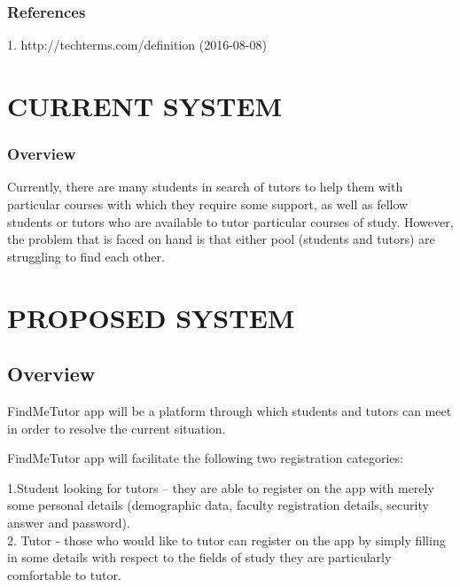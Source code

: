 \documentclass[12pt]{article}
\begin{document}
\subsubsection{References}
1. http://techterms.com/definition (2016-08-08)

\section{CURRENT SYSTEM}
\subsubsection{Overview}
\begin{flushleft}
Currently, there are many students in search of tutors to help them with particular courses with which they require some support, as well as fellow students or tutors who are available to tutor particular courses of study. However, the problem that is faced on hand is that either pool (students and tutors) are struggling to find each other. 
\end{flushleft}

\section{PROPOSED SYSTEM}
\subsection{Overview}
\begin{flushleft}
FindMeTutor app will be a platform through which students and tutors can meet in order to resolve the current situation. 
\end{flushleft}
\begin{flushleft}
FindMeTutor app will facilitate the following two registration categories: 

\begin{flushleft}
1.Student looking for tutors – they are able to  register on the app with merely some personal details (demographic data, faculty registration details, security answer and password).\\
2. Tutor - those who would like to tutor can register on the app by simply filling in some details with respect to the fields of study they are particularly comfortable to tutor.\\
\end{flushleft}
\end{flushleft}
\end{document}
